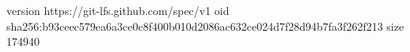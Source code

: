 version https://git-lfs.github.com/spec/v1
oid sha256:b93ceec579ea6a3ce0c8f400b010d2086ac632ce024d7f28d94b7fa3f262f213
size 174940
